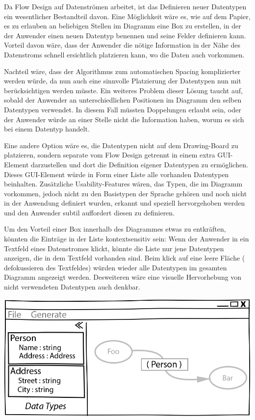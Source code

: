 Da Flow Design auf Datenströmen arbeitet, ist das Definieren neuer Datentypen
ein wesentlicher Bestandteil davon.
Eine Möglichkeit wäre es, wie auf dem Papier, es zu erlauben an beliebigen
Stellen im Diagramm eine Box zu erstellen, in der der Anwender einen neuen
Datentyp benennen und seine Felder definieren kann. Vorteil davon wäre, dass der
Anwender die nötige Information in der Nähe des Datenstroms schnell ersichtlich
platzieren kann, wo die Daten auch vorkommen.

Nachteil wäre, dass der Algorithmus zum automatischen Spacing komplizierter
werden würde, da nun auch eine sinnvolle Platzierung der Datentypen nun mit
berücksichtigen werden müsste.
Ein weiteres Problem dieser Lösung taucht auf, sobald der Anwender an unterschiedlichen
Positionen im Diagramm den selben Datentypen verwendet. In diesem Fall müssten Doppelungen erlaubt
sein, oder der Anwender würde an einer Stelle nicht die Information haben, worum
es sich bei einem Datentyp handelt.

Eine andere Option wäre es, die Datentypen nicht auf dem Drawing-Board zu
platzieren, sondern separate vom Flow Design getrennt in einem extra GUI-Element
darzustellen und dort die Definition eigener Datentypen zu ermöglichen.
Dieses GUI-Element würde in Form einer Liste alle vorhanden Datentypen
beinhalten. Zusätzliche Usability-Features wären, das Typen, die im Diagramm
vorkommen, jedoch nicht zu den Basistypen der Sprache gehören und noch nicht in
der Anwendung definiert wurden, erkannt und speziell hervorgehoben werden und
den Anwender subtil auffordert diesen zu definieren.

Um den Vorteil einer Box innerhalb des Diagrammes etwas zu entkräften, könnten
die Einträge in der Liste kontextsensitiv sein: Wenn der Anwender in ein
Textfeld eines Datenstromes klickt, könnte die Liste nur jene Datentypen
anzeigen, die in dem Textfeld vorhanden sind. Beim klick auf eine leere Fläche (
defokussieren des Textfeldes) würden wieder alle Datentypen im gesamten Diagramm
angezeigt werden. Desweiteren wäre eine visuelle Hervorhebung von nicht
verwendeten Datentypen auch denkbar.
\bigskip

\includegraphics[width=.9\linewidth]{./img/DatatypesCrop.jpg}


